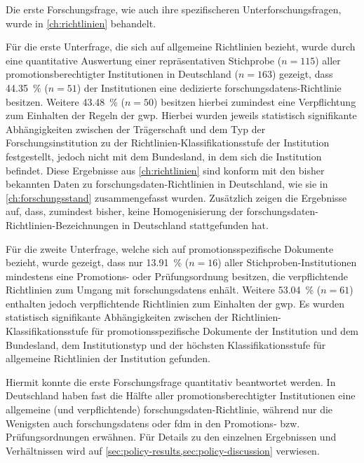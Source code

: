 Die erste Forschungsfrage, wie auch ihre spezifischeren Unterforschungsfragen, wurde in \cref{ch:richtlinien} behandelt.

Für die erste Unterfrage, die sich auf allgemeine Richtlinien bezieht, wurde durch eine quantitative Auswertung einer repräsentativen Stichprobe ($n=\num{115}$) aller promotionsberechtigter Institutionen in Deutschland ($n=\num{163}$) gezeigt, dass \SI{44.35}{\percent} ($n=\num{51}$) der Institutionen eine dedizierte \glspl{forschungsdaten}-Richtlinie besitzen.
Weitere \SI{43.48}{\percent} ($n=\num{50}$) besitzen hierbei zumindest eine Verpflichtung zum Einhalten der Regeln der \gls{gwp}.
Hierbei wurden jeweils statistisch signifikante Abhängigkeiten zwischen der Trägerschaft und dem Typ der Forschungsinstitution zu der Richtlinien-Klassifikationsstufe der Institution festgestellt, jedoch nicht mit dem Bundesland, in dem sich die Institution befindet.
Diese Ergebnisse aus \cref{ch:richtlinien} sind konform mit den bisher bekannten Daten zu \gls{forschungsdaten}-Richtlinien in Deutschland, wie sie in \cref{ch:forschungsstand} zusammengefasst wurden.
Zusätzlich zeigen die Ergebnisse auf, dass, zumindest bisher, keine Homogenisierung der \gls{forschungsdaten}-Richtlinien-Bezeichnungen in Deutschland stattgefunden hat.

Für die zweite Unterfrage, welche sich auf promotionsspezifische Dokumente bezieht, wurde gezeigt, dass nur \SI{13.91}{\percent} ($n=\num{16}$) aller Stichproben-Institutionen mindestens eine Promotions- oder Prüfungsordnung besitzen, die verpflichtende Richtlinien zum Umgang mit \glspl{forschungsdaten} enhält.
Weitere \SI{53.04}{\percent} ($n=\num{61}$) enthalten jedoch verpflichtende Richtlinien zum Einhalten der \gls{gwp}.
Es wurden statistisch signifikante Abhängigkeiten zwischen der Richtlinien-Klassifikationsstufe für promotionsspezifische Dokumente der Institution und dem Bundesland, dem Institutionstyp und der höchsten Klassifikationsstufe für allgemeine Richtlinien der Institution gefunden.

Hiermit konnte die erste Forschungsfrage quantitativ beantwortet werden.
In Deutschland haben fast die Hälfte aller promotionsberechtigter Institutionen eine allgemeine (und verpflichtende) \gls{forschungsdaten}-Richtlinie, während nur die Wenigsten auch \glspl{forschungsdaten} oder \gls{fdm} in den Promotions- bzw. Prüfungsordnungen erwähnen.
Für Details zu den einzelnen Ergebnissen und Verhältnissen wird auf \cref{sec:policy-results,sec:policy-discussion} verwiesen.

